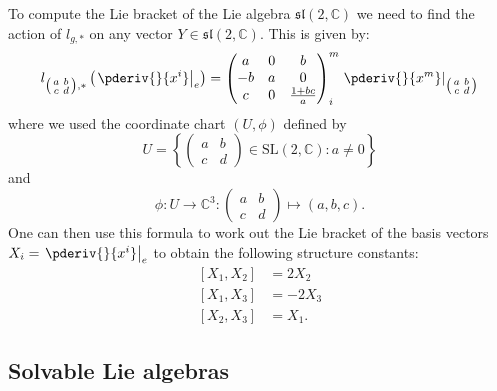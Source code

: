     \begin{example}
        To compute the Lie bracket of the Lie algebra $\mathfrak{sl}(2, \mathbb{C})$ we need to find the action of $l_{g,*}$ on any vector $Y\in\mathfrak{sl}(2, \mathbb{C})$. This is given by:
        \begin{gather}
            l_{\left(\begin{smallmatrix}a&b\\c&d\end{smallmatrix}\right), *}\left(\left.\pderiv{}{x^i}\right|_e\right)
            = \left(\begin{matrix}a&0&b\\-b&a&0\\c&0&\frac{1+bc}{a}\end{matrix}\right)^m_i\left.\pderiv{}{x^m}\right|_{\left(\begin{smallmatrix}a&b\\c&d\end{smallmatrix}\right)}
        \end{gather}
        where we used the coordinate chart $(U,\phi)$ defined by \[U = \left\{\left(\begin{matrix}a&b\\c&d\end{matrix}\right)\in\text{SL}(2, \mathbb{C}): a\neq0\right\}\] and \[\phi:U\rightarrow\mathbb{C}^3:\left(\begin{matrix}a&b\\c&d\end{matrix}\right)\mapsto(a,b,c).\] One can then use this formula to work out the Lie bracket of the basis vectors $X_i = \left.\pderiv{}{x^i}\right|_e$ to obtain the following structure constants:
        \begin{align}
            \label{lie:sl2c_lie_brackets}
            [X_1,X_2] &= 2X_2\nonumber\\
            [X_1,X_3] &= -2X_3\\
            [X_2,X_3] &= X_1.\nonumber
        \end{align}
    \end{example}

\subsection{Solvable Lie algebras}


